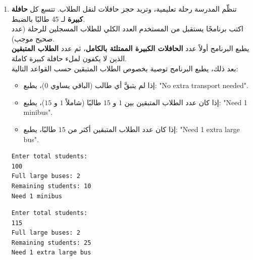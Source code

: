 \documentclass[14pt]{extarticle}
\begin{document}
\begin{enumerate}[resume, itemsep=2.2em]
\begin{boxSolution}
\begin{english}
\begin{verbatim}
int hundreds = num / 100;
int tens = (num / 10) % 10;
int units = num % 10;

int newNum = hundreds * 10 + units;
Console.WriteLine(newNum);

if (tens == 0)
{
    Console.WriteLine("Middle digit is zero");
}
else if (newNum % tens == 0)
{
    Console.WriteLine("Divisible");
}
else
{
    Console.WriteLine("Not divisible");
}
\end{verbatim}
\end{english}
\end{boxSolution}
\fi
\filbreak

\item
تنظّم المدرسة رحلة تعليمية، وتريد حجز حافلات لنقل الطلاب. تتسع كل \textbf{حافلة كبيرة} لـ \textenglish{45} طالبًا بالضبط. \\
اكتب برنامجًا يستقبل من المستخدم العدد الكلي للطلاب المسجلين للرحلة (عدد صحيح موجب). \\
يطبع البرنامج أولاً عدد \textbf{الحافلات الكبيرة الممتلئة بالكامل}، ثم عدد \textbf{الطلاب المتبقين} الذين لا يكفون لملء حافلة كبيرة كاملة. \\
بعد ذلك، يطبع البرنامج توصية بخصوص الطلاب المتبقين حسب القواعد التالية:
\begin{itemize}[nosep]
    \item إذا لم يتبقَّ أي طالب (الباقي يساوي $0$)، يطبع: \textenglish{"No extra transport needed"}.
    \item إذا كان عدد الطلاب المتبقين بين $1$ و $15$ طالبًا (شاملاً $1$ و $15$)، يطبع: \textenglish{"Need 1 minibus"}.
    \item إذا كان عدد الطلاب المتبقين أكثر من $15$ طالبًا، يطبع: \textenglish{"Need 1 extra large bus"}.
\end{itemize}

\ifdetailed
\begin{boxExample}[1]
\begin{english}
\begin{verbatim}
Enter total students:
100
Full large buses: 2
Remaining students: 10
Need 1 minibus
\end{verbatim}
\end{english}
\end{boxExample}
\begin{boxExample}[2]
\begin{english}
\begin{verbatim}
Enter total students:
115
Full large buses: 2
Remaining students: 25
Need 1 extra large bus
\end{verbatim}
\end{english}
\end{boxExample}
\fi


\end{enumerate}
\end{document}
